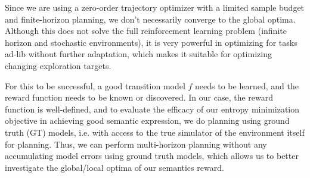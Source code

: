 Since we are using a zero-order trajectory optimizer with a limited sample budget and finite-horizon planning, we don't necessarily converge to the global optima.
Although this does not solve the full reinforcement learning problem (infinite horizon and stochastic environments), it is very powerful in optimizing for tasks ad-lib without further adaptation, which makes it suitable for optimizing changing exploration targets.

For this to be successful, a good transition model \(f\) needs to be learned, and the reward function needs to be known or discovered.
In our case, the reward function is well-defined, and to evaluate the efficacy of our entropy minimization objective in achieving good semantic expression,
we do planning using ground truth (GT) models, i.e. with access to the true simulator of the environment itself for planning.
Thus, we can perform multi-horizon planning without any accumulating model errors using ground truth models, which allows us to better investigate the global/local optima of our semantics reward. 

